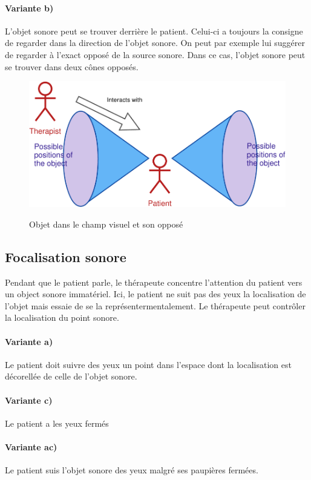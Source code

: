 \documentclass[french]{article}
\begin{document}
\paragraph{Variante b)}
L'objet sonore peut se trouver derrière le patient. Celui-ci a toujours la consigne de regarder dans la direction de l'objet sonore. On peut par exemple lui suggérer de regarder à l'exact opposé de la source sonore. Dans ce cas, l'objet sonore peut se trouver dans deux cônes opposés.

\begin{figure}[!h]
	\centering
	\includegraphics[scale = 0.7]{schemas/double-conic-situation.pdf}
	\label{double-conic-situation}
	\caption{Objet dans le champ visuel et son opposé}
\end{figure}



\subsection{Focalisation sonore}
Pendant que le patient parle, le thérapeute concentre l'attention du patient vers un object sonore immatériel. Ici, le patient ne suit pas des yeux la localisation de l'objet mais essaie de se la représentermentalement. Le thérapeute peut contrôler la localisation du point sonore.

\paragraph{Variante a)} Le patient doit suivre des yeux un point dans l'espace dont la localisation est décorellée de celle de l'objet sonore.

\paragraph{Variante c)} Le patient a les yeux fermés
\paragraph{Variante ac)} Le patient suis l'objet sonore des yeux malgré ses paupières fermées.
\end{document}

